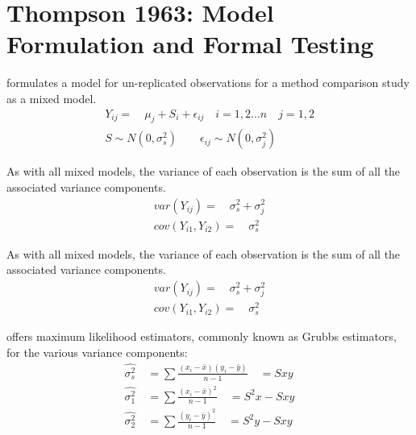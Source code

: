\documentclass[12pt, a4paper]{report}
\theoremstyle{plain}
\theoremstyle{definition}
\theoremstyle{remark}
\begin{document}












\section{Thompson 1963: Model Formulation and Formal Testing}

\citet{Kinsella} formulates a model for un-replicated observations
for a method comparison study as a mixed model.
\begin{eqnarray}
Y_{ij} =\quad \mu_{j} + S_{i} + \epsilon_{ij} \quad i=1,2...n\quad
j=1,2\\
S \sim N(0,\sigma^{2}_{s})\qquad \epsilon_{ij} \sim
N(0,\sigma^{2}_{j}) \nonumber
\end{eqnarray}

As with all mixed models, the variance of each observation is the
sum of all the associated variance components.
\begin{eqnarray}
var(Y_{ij}) =\quad \sigma^{2}_{s} + \sigma^{2}_{j} \\
cov(Y_{i1},Y_{i2})=\quad \sigma^{2}_{s} \nonumber
\end{eqnarray}

As with all mixed models, the variance of each observation is the sum of all the associated variance components.
\begin{eqnarray}
var(Y_{ij}) =\quad \sigma^{2}_{s} + \sigma^{2}_{j} \\
cov(Y_{i1},Y_{i2})=\quad \sigma^{2}_{s} \nonumber
\end{eqnarray}

\citet{Grubbs48} offers maximum likelihood estimators, commonly
known as Grubbs estimators, for the various variance components:
\begin{eqnarray}
\hat{\sigma^{2}_{s}} \quad= \sum{\frac{(x_{i}-\bar{x})(y_{i}-\bar{y})}{n-1}}\quad=Sxy\\
\hat{\sigma^{2}_{1}} \quad= \sum{\frac{(x_{i}-\bar{x})^{2}}{n-1}} \quad=S^{2}x-Sxy \nonumber\\
\hat{\sigma^{2}_{2}} \quad=
\sum{\frac{(y_{i}-\bar{y})^{2}}{n-1}}\quad=S^{2}y-Sxy \nonumber
\nonumber
\end{eqnarray}
\end{document}
